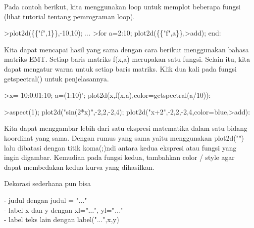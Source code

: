 \documentclass[a4paper,10pt]{article}
\begin{document}
\begin{eulernotebook}
\begin{eulercomment}
\begin{eulercomment}
\begin{eulercomment}
\begin{eulercomment}
\begin{eulercomment}
\begin{eulercomment}
\begin{eulercomment}
Pada contoh berikut, kita menggunakan loop untuk memplot beberapa
fungsi (lihat tutorial tentang pemrograman loop).
\end{eulercomment}
\begin{eulerprompt}
>plot2d(\{\{"f",1\}\},-10,10); ...
>for a=2:10; plot2d(\{\{"f",a\}\},>add); end:
\end{eulerprompt}
\begin{eulercomment}
Kita dapat mencapai hasil yang sama dengan cara berikut menggunakan
bahasa matriks EMT. Setiap baris matriks f(x,a) merupakan satu fungsi.
Selain itu, kita dapat mengatur warna untuk setiap baris matriks. Klik
dua kali pada fungsi getspectral() untuk penjelasannya.
\end{eulercomment}
\begin{eulerprompt}
>x=-10:0.01:10; a=(1:10)'; plot2d(x,f(x,a),color=getspectral(a/10)):
\end{eulerprompt}
\begin{eulerprompt}
>aspect(1); plot2d("sin(2*x)",-2,2,-2,4); plot2d("x+2",-2,2,-2,4,color=blue,>add):
\end{eulerprompt}
\begin{eulercomment}
Kita dapat menggambar lebih dari satu ekspresi matematika dalam satu
bidang koordinat yang sama. Dengan rumus yang sama yaitu menggunakan
plot2d("") lalu dibatasi dengan titik koma(;)ndi antara kedua ekspresi
atau fungsi yang ingin digambar. Kemudian pada fungsi kedua, tambahkan
color / style agar dapat membedakan kedua kurva yang dihasilkan.


\end{eulercomment}
\begin{eulercomment}
Dekorasi sederhana pun bisa

- judul dengan judul = "..."\\
- label x dan y dengan xl="...", yl="..."\\
- label teks lain dengan label("...",x,y)


\end{eulercomment}
\end{eulercomment}
\end{eulercomment}
\end{eulercomment}
\end{eulercomment}
\end{eulercomment}
\end{eulercomment}
\end{eulernotebook}
\end{document}
